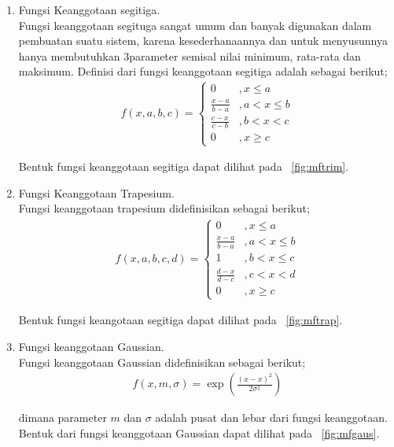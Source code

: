 \begin{enumerate}
  \item Fungsi Keanggotaan segitiga.\\
  Fungsi keanggotaan segituga sangat umum dan banyak digunakan dalam pembuatan
  suatu sistem, karena kesederhanaannya dan untuk menyusunnya hanya membutuhkan
  3parameter semisal nilai minimum, rata-rata dan maksimum. Definisi dari fungsi
  keanggotaan segitiga adalah sebagai berikut;
  \begin{align}
	\label{eq:mftrim}
	f(x, a, b, c) = \left\{ 
	\begin{array}{ll}
	0 & , x \leq a\\
	\frac{x - a}{b - a} & , a < x \leq b \\
	\frac{c - x}{c - b} & , b < x < c \\
	0 & , x \geq c
	\end{array}
  \end{align}
   
   Bentuk fungsi keanggotaan segitiga dapat dilihat pada \pic~\ref{fig:mftrim}.
   
   \item Fungsi Keanggotaan Trapesium.\\
   Fungsi keanggotaan trapesium didefinisikan sebagai berikut;
   \begin{align}
	\label{eq:mftrap}
	f(x, a, b, c, d) = \left\{ 
	\begin{array}{ll}
	0 & , x \leq a\\
	\frac{x - a}{b - a} & , a < x \leq b \\
	1 & , b < x \leq c \\
	\frac{d - x}{d - c} & , c < x < d \\
	0 & , x \geq c
	\end{array}
  \end{align}
  
  Bentuk fungsi keangotaan segitiga dapat dilihat pada \pic~\ref{fig:mftrap}.
   
   \item Fungsi keanggotaan Gaussian.\\
   Fungsi keanggotaan Gaussian didefinisikan sebagai berikut;
	\begin{align}
	\label{eq:mfgaus}
		f(x, m, \sigma) = \exp\left(\frac{(x-x)^2}{2\sigma^2}\right)
	\end{align}

	dimana parameter $m$ dan $\sigma$ adalah pusat dan lebar dari fungsi
	keanggotaan. Bentuk dari fungsi keanggotaan Gaussian dapat dilihat pada
	\pic~\ref{fig:mfgaus}.
	    
\end{enumerate}
	
